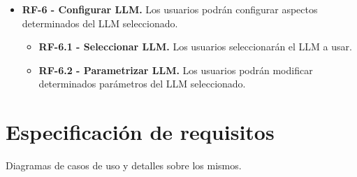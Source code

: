 \begin{itemize}
\begin{itemize}
    \end{itemize}
    \item \textbf{RF-6 - Configurar LLM.} Los usuarios podrán configurar aspectos determinados del LLM seleccionado.
    \begin{itemize}
        \item \textbf{RF-6.1 - Seleccionar LLM.} Los usuarios seleccionarán el LLM a usar.
        \item \textbf{RF-6.2 - Parametrizar LLM.} Los usuarios podrán modificar determinados parámetros del LLM seleccionado.
    \end{itemize}
\end{itemize}

\section{Especificación de requisitos}

Diagramas de casos de uso y detalles sobre los mismos.


